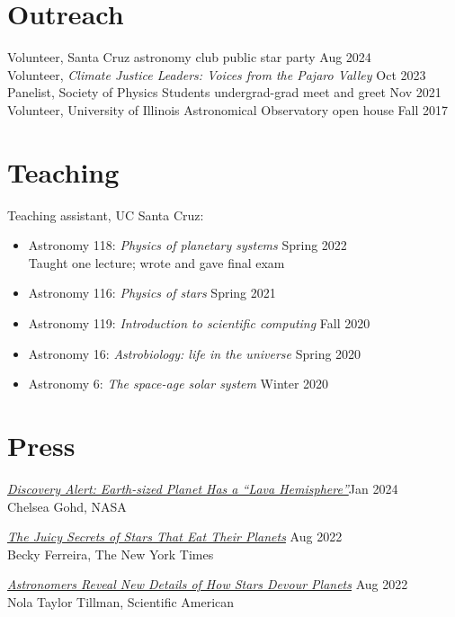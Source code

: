 \documentclass[12pt]{article}
\begin{document}
\ifdefined\withoutreach{}
\section*{Outreach}
Volunteer, Santa Cruz astronomy club public star party \hfill Aug 2024\\
Volunteer, \textit{Climate Justice Leaders: Voices from the Pajaro Valley} \hfill Oct 2023\\
Panelist, Society of Physics Students undergrad-grad meet and greet \hfill Nov 2021\\
Volunteer, University of Illinois Astronomical Observatory open house \hfill Fall 2017
\else\fi

\section*{Teaching}
Teaching assistant, UC Santa Cruz:
\begin{itemize}
\item Astronomy 118: \textit{Physics of planetary systems} \hfill Spring 2022\\Taught one lecture; wrote and gave final exam
\item Astronomy 116: \textit{Physics of stars} \hfill Spring 2021
\item Astronomy 119: \textit{Introduction to scientific computing} \hfill Fall 2020
\item Astronomy 16: \textit{Astrobiology: life in the universe} \hfill Spring 2020
\item Astronomy 6: \textit{The space-age solar system} \hfill Winter 2020
\end{itemize}

\ifdefined\withpress{}
\section*{Press}
\href{https://science.nasa.gov/universe/exoplanets/discovery-alert-earth-sized-planet-has-a-lava-hemisphere/}{\textit{Discovery Alert: Earth-sized Planet Has a ``Lava Hemisphere''}}\hfill Jan 2024\\
Chelsea Gohd, NASA

\href{https://www.nytimes.com/2022/08/19/science/stars-planets-engulfment.html}{\textit{The Juicy Secrets of Stars That Eat Their Planets}} \hfill Aug 2022\\
Becky Ferreira, The New York Times

\href{https://www.scientificamerican.com/article/astronomers-reveal-new-details-of-how-stars-devour-planets/}{\textit{Astronomers Reveal New Details of How Stars Devour Planets}} \hfill Aug 2022\\
Nola Taylor Tillman, Scientific American
\end{document}
